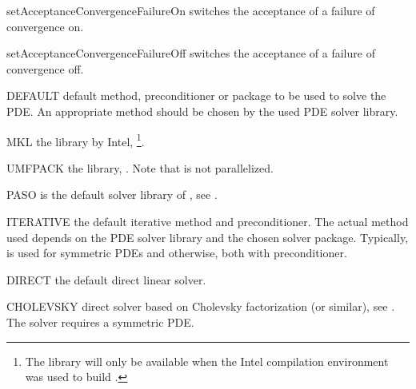 \begin{methoddesc}[SolverOptions]{setAcceptanceConvergenceFailureOn}{}
switches the acceptance of a failure of convergence on.
\end{methoddesc}

\begin{methoddesc}[SolverOptions]{setAcceptanceConvergenceFailureOff}{}
switches the acceptance of a failure of convergence off.
\end{methoddesc}
    
\begin{memberdesc}[SolverOptions]{DEFAULT}
default method, preconditioner or package to be used to solve the PDE.
An appropriate method should be chosen by the used PDE solver library.
\end{memberdesc}

\begin{memberdesc}[SolverOptions]{MKL}
the \MKL library by Intel, \footnote{The \MKL library will only be
available when the Intel compilation environment was used to build \escript.}.
\end{memberdesc}

\begin{memberdesc}[SolverOptions]{UMFPACK}
the \UMFPACK library, . Note that \UMFPACK is not parallelized.
\end{memberdesc}

\begin{memberdesc}[SolverOptions]{PASO}
\PASO is the default solver library of \finley, see .
\end{memberdesc}

\begin{memberdesc}[SolverOptions]{ITERATIVE}
the default iterative method and preconditioner. The actual method used
depends on the PDE solver library and the chosen solver package.
Typically, \PCG is used for symmetric PDEs and \BiCGStab otherwise, both with
\JACOBI preconditioner.
\end{memberdesc}

\begin{memberdesc}[SolverOptions]{DIRECT}
the default direct linear solver.
\end{memberdesc}

\begin{memberdesc}[SolverOptions]{CHOLEVSKY}
direct solver based on Cholevsky factorization (or similar), see .
The solver requires a symmetric PDE.
\end{memberdesc}

